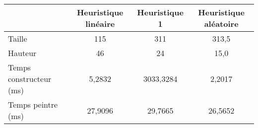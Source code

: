 \begin{center}
{\tabulinesep=1.2mm
\begin{tabu}{|l|c|c|c|}
  \hline
  & Heuristique linéaire  & Heuristique 1 & Heuristique aléatoire \\ 
  \hline
  Taille &       115&       311&     313,5  \\ 
  \hline
  Hauteur &        46&        24&      15,0  \\ 
  \hline
  Temps constructeur (ms) &          5,2832&       3033,3284&          2,2017  \\ 
  \hline
  Temps peintre (ms) &           27,9096&          29,7665&          26,5652  \\ 
  \hline
\end{tabu}
}
\end{center}

